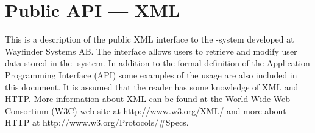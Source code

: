 % 
% 
% 
% 
% 
%
%
%


\chapter{Public API --- XML} \label{publicxmlapi}


This is a description of the public XML interface to the \mc-system 
developed at Wayfinder Systems AB. The interface allows users to 
retrieve and modify user data stored in the \mc-system.
In addition to the formal definition of the Application Programming 
Interface (API) some examples of the usage are also included in 
this document. 
It is assumed that the reader has some knowledge of XML and HTTP. 
More information about XML can be found at the World Wide Web 
Consortium (W3C) web site at http://www.w3.org/XML/ and more about HTTP
at http://www.w3.org/Protocols/\#Specs.


